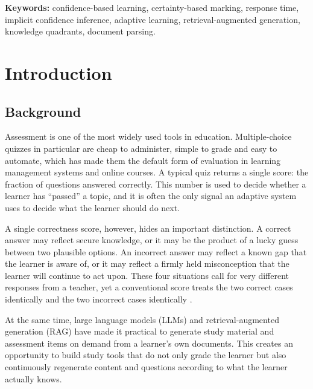 \documentclass[12pt,a4paper,oneside]{report}
\begin{document}
\vspace{0.5cm}
\noindent\textbf{Keywords:} confidence-based learning, certainty-based
marking, response time, implicit confidence inference, adaptive learning, retrieval-augmented generation, knowledge
quadrants, document parsing.

\clearpage

\tableofcontents
\clearpage
\listoffigures
{}
\clearpage
\listoftables
{}
\clearpage

\setcounter{page}{1}

\chapter{Introduction}

\section{Background}

Assessment is one of the most widely used tools in education. Multiple-choice
quizzes in particular are cheap to administer, simple to grade and easy to
automate, which has made them the default form of evaluation in learning
management systems and online courses. A typical quiz returns a single
score: the fraction of questions answered correctly. This number is used to
decide whether a learner has ``passed'' a topic, and it is often the only
signal an adaptive system uses to decide what the learner should do next.

A single correctness score, however, hides an important distinction. A
correct answer may reflect secure knowledge, or it may be the product of a
lucky guess between two plausible options. An incorrect answer may reflect
a known gap that the learner is aware of, or it may reflect a firmly held
misconception that the learner will continue to act upon. These four
situations call for very different responses from a teacher, yet a
conventional score treats the two correct cases identically and the two
incorrect cases identically \cite{benchprep}.

At the same time, large language models (LLMs) and retrieval-augmented
generation (RAG) \cite{lewis2020rag} have made it practical to generate
study material and assessment items on demand from a learner's own
documents. This creates an opportunity to build study tools that do not
only grade the learner but also continuously regenerate content and
questions according to what the learner actually knows.
\end{document}
